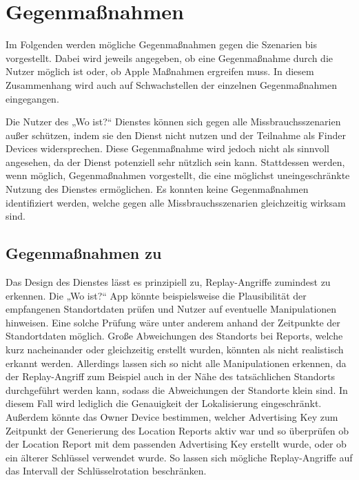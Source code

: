 \section{Gegenmaßnahmen}
\label{sec:Gegenmassnahmen}

Im Folgenden werden mögliche Gegenmaßnahmen gegen die Szenarien  bis  vorgestellt.
Dabei wird jeweils angegeben, ob eine Gegenmaßnahme durch die Nutzer möglich ist oder, ob Apple Maßnahmen ergreifen muss.
In diesem Zusammenhang wird auch auf Schwachstellen der einzelnen Gegenmaßnahmen eingegangen.

Die Nutzer des „Wo ist?“ Dienstes können sich gegen alle Missbrauchsszenarien außer  schützen, indem sie den Dienst nicht nutzen und der Teilnahme als Finder Devices widersprechen.
Diese Gegenmaßnahme wird jedoch nicht als sinnvoll angesehen, da der Dienst potenziell sehr nützlich sein kann.
Stattdessen werden, wenn möglich, Gegenmaßnahmen vorgestellt, die eine möglichst uneingeschränkte Nutzung des Dienstes ermöglichen.
Es konnten keine Gegenmaßnahmen identifiziert werden, welche gegen alle Missbrauchsszenarien gleichzeitig wirksam sind.


\subsection{Gegenmaßnahmen zu }
Das Design des Dienstes lässt es prinzipiell zu, Replay-Angriffe zumindest zu erkennen.
Die „Wo ist?“ App könnte beispielsweise die Plausibilität der empfangenen Standortdaten prüfen und Nutzer auf eventuelle Manipulationen hinweisen.
Eine solche Prüfung wäre unter anderem anhand der Zeitpunkte der Standortdaten möglich.
Große Abweichungen des Standorts bei Reports, welche kurz nacheinander oder gleichzeitig erstellt wurden, könnten als nicht realistisch erkannt werden.
Allerdings lassen sich so nicht alle Manipulationen erkennen, da der Replay-Angriff zum Beispiel auch in der Nähe des tatsächlichen Standorts durchgeführt werden kann, sodass die Abweichungen der Standorte klein sind.
In diesem Fall wird lediglich die Genauigkeit der Lokalisierung eingeschränkt.
Außerdem könnte das Owner Device bestimmen, welcher Advertising Key zum Zeitpunkt der Generierung des Location Reports aktiv war und so überprüfen ob der Location Report mit dem passenden Advertising Key erstellt wurde, oder ob ein älterer Schlüssel verwendet wurde.
So lassen sich mögliche Replay-Angriffe auf das Intervall der Schlüsselrotation beschränken.


